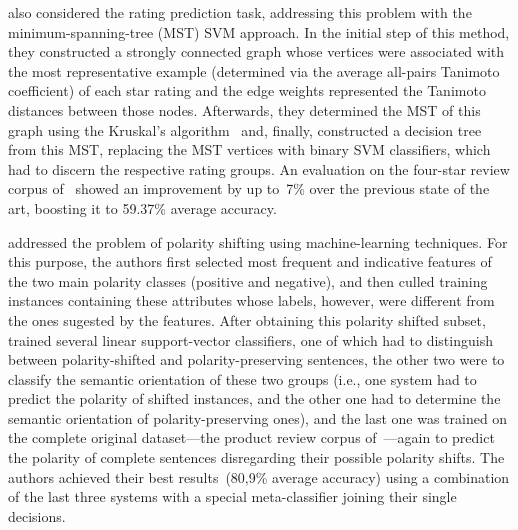 
\citet{Bickerstaffe:10} also considered the rating prediction task,
addressing this problem with the minimum-spanning-tree (MST) SVM
approach.  In the initial step of this method, they constructed a
strongly connected graph whose vertices were associated with the most
representative example (determined via the average all-pairs Tanimoto
coefficient) of each star rating and the edge weights represented the
Tanimoto distances between those nodes.  Afterwards, they determined
the MST of this graph using the Kruskal's
algorithm~\cite[see][pp.~567--574]{Cormen:09} and, finally,
constructed a decision tree from this MST, replacing the MST vertices
with binary SVM classifiers, which had to discern the respective
rating groups. An evaluation on the four-star review corpus
of~\citet{Pang:05} showed an improvement by up to~7\% over the
previous state of the art, boosting it to 59.37\% average accuracy.


\citet{Li:10b} addressed the problem of polarity shifting using
machine-learning techniques.  For this purpose, the authors first
selected most frequent and indicative features of the two main
polarity classes (positive and negative), and then culled training
instances containing these attributes whose labels, however, were
different from the ones sugested by the features.  After obtaining
this polarity shifted subset, \citeauthor{Li:10b} trained several
linear support-vector classifiers, one of which had to distinguish
between polarity-shifted and polarity-preserving sentences, the other
two were to classify the semantic orientation of these two groups
(i.e., one system had to predict the polarity of shifted instances,
and the other one had to determine the semantic orientation of
polarity-preserving ones), and the last one was trained on the
complete original dataset---the product review corpus
of~\citet{Blitzer:06}---again to predict the polarity of complete
sentences disregarding their possible polarity shifts.  The authors
achieved their best results~(80,9\% average accuracy) using a
combination of the last three systems with a special meta-classifier
joining their single decisions.


